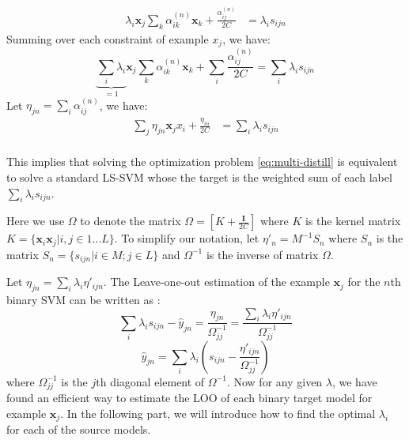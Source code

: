 \begin{equation}
\begin{aligned}
\lambda_i\textbf{x}_j\sum_{k}\alpha^{(n)}_{ik}\textbf{x}_k+\frac{\alpha^{(n)}_{ij}}{2C}&=\lambda_is_{ijn}
\end{aligned}
\end{equation}
Summing over each constraint of example $x_j$, we have:
\begin{equation}
\underbrace{\sum_i\lambda_i}_{=1} \textbf{x}_j\sum_{k}\alpha^{(n)}_{ik}\textbf{x}_k+\sum_i\frac{\alpha^{(n)}_{ij}}{2C}=\sum_i\lambda_is_{ijn}
\end{equation}
Let %
$\eta_{jn}=\sum_i\alpha^{(n)}_{ij}$, we have:
\begin{equation}
\begin{aligned}
\sum_j\eta_{jn}\textbf{x}_jx_i+\frac{\eta_{in}}{2C}&=\sum_i\lambda_is_{ijn}\\
\end{aligned}
\end{equation}

This implies that solving the optimization problem \eqref{eq:multi-distill} is equivalent to solve a standard LS-SVM \cite{suykens1999least} whose the target is the weighted sum of each label $\sum_i\lambda_is_{ijn}$.

Here we use $\Omega$ to denote the matrix $\Omega=[K+\frac{\mathbf{I}}{2C}]$ where $K$ is the kernel matrix $K=\{\textbf{x}_i\textbf{x}_j|i,j\in 1\dots L\}$. To simplify our notation, let ${\eta}'_{n}=M^{-1}S_n$ where $S_n$ is the matrix $S_n=\{s_{ijn}|i\in M;j\in L\}$ and $\Omega^{-1}$ is the inverse of matrix $\Omega$. 

Let $\eta_{jn}=\sum_i\lambda_i{\eta}'_{ijn}$.
The Leave-one-out estimation of the example $\textbf{x}_j$ for the $n$th binary SVM can be written as \cite{cawley2006leave}:
\[\sum_i\lambda_is_{ijn}-\hat{y}_{jn} =\frac{{\eta}_{jn}}{\Omega_{jj}^{-1}} =\frac{\sum_i\lambda_i{\eta}'_{ijn}}{\Omega_{jj}^{-1}}\]
\begin{equation}\label{eq:yhat}
\hat{y}_{jn} = \sum_i\lambda_i\left(s_{ijn}-\frac{{\eta}'_{ijn}}{\Omega_{jj}^{-1}}\right)
\end{equation}
where $\Omega^{-1}_{jj}$ is the $j$th diagonal element of $\Omega^{-1}$. Now for any given $\lambda$, we have found an efficient way to estimate the LOO of each binary target model for example $\textbf{x}_j$. In the following part, we will introduce how to find the optimal $\lambda_i$ for each of the source models. 
